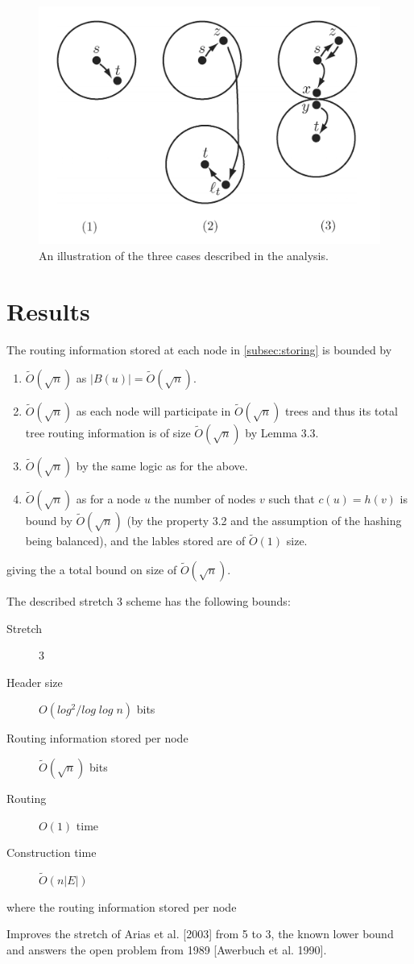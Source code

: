 \begin{figure}[htbp]
    \centering
    \includegraphics[scale=0.3]{images/threecases.png} 
    \caption{An illustration of the three cases described in the analysis.}
    \label{fig:threecases}
\end{figure}


\section{Results}
The routing information stored at each node in \ref{subsec:storing} is bounded by
\begin{enumerate}
    \item $\tilde{O}(\sqrt{n})$ as $|B(u)| = \tilde{O}(\sqrt{n})$.
    \item $\tilde{O}(\sqrt{n})$ as each node will participate in $\tilde{O}(\sqrt{n})$ trees and thus its total tree routing information is of size $\tilde{O}(\sqrt{n})$ by Lemma 3.3.
    \item $\tilde{O}(\sqrt{n})$ by the same logic as for the above.
    \item $\tilde{O}(\sqrt{n})$ as for a node $u$ the number of nodes $v$ such that $c(u) = h(v)$ is bound by $\tilde{O}(\sqrt{n})$ (by the property 3.2 and the assumption of the hashing being balanced), and the lables stored are of $\tilde{O}(1)$ size.
\end{enumerate}
giving the a total bound on size of $\tilde{O}(\sqrt{n})$.

The described stretch 3 scheme has the following bounds:
\begin{description}
    \item[Stretch] 3
    \item[Header size] $O(log^2/log\;log\;n)$ bits
    \item[Routing information stored per node] $\tilde{O}(\sqrt{n})$ bits
    \item[Routing] $O(1)$ time
    \item[Construction time] $\tilde{O}(n|E|)$
\end{description}
where the routing information stored per node 

Improves the stretch of Arias et al. [2003]\cite{ariasEtAl2003} from 5 to 3, the known lower bound and answers the open problem from 1989 [Awerbuch et al. 1990]. %
